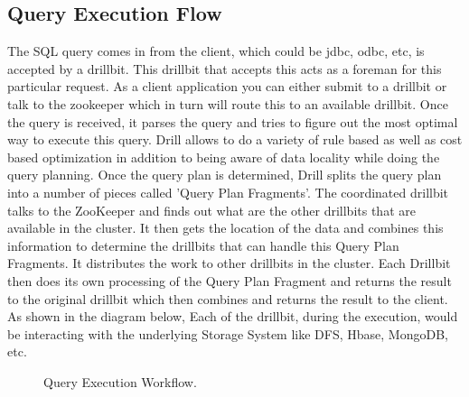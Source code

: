 \documentclass[9pt,twocolumn,twoside]{../../styles/osajnl}
\begin{document}
\subsection{Query Execution Flow}
The SQL query comes in from the client, which could be jdbc, odbc, etc, is accepted by a drillbit. This drillbit that accepts this acts as a foreman for this particular request. As a client application you can either submit to a drillbit or talk to the zookeeper which in turn will route this to an available drillbit. Once the query is received, it parses the query and tries to figure out the most optimal way to execute this query. Drill allows to do a variety of rule based as well as cost based optimization in addition to being aware of data locality while doing the query planning. Once the query plan is determined, Drill splits the query plan into a number of pieces called 'Query Plan Fragments'. The coordinated drillbit talks to the ZooKeeper and finds out what are the other drillbits that are available in the cluster. It then gets the location of the data and combines this information to determine the drillbits that can handle this Query Plan Fragments. It distributes the work to other drillbits in the cluster. Each Drillbit then does its own processing of the Query Plan Fragment and returns the result to the original drillbit which then combines and returns the result to the client. As shown in the diagram below, Each of the drillbit, during the execution, would be interacting with the underlying Storage System like DFS, Hbase, MongoDB, etc.

\begin{figure}[htbp]
	\centering
	\caption{Query Execution Workflow.}
	\label{fig:Drill-arch}
\end{figure}
\end{document}
